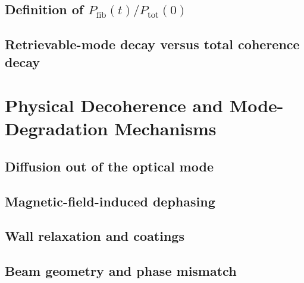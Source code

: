 \subsection{Definition of $P_{\text{fib}}(t)/P_{\text{tot}}(0)$}
\subsection{Retrievable-mode decay versus total coherence decay}

\section{Physical Decoherence and Mode-Degradation Mechanisms}
\subsection{Diffusion out of the optical mode}
\subsection{Magnetic-field-induced dephasing}
\subsection{Wall relaxation and coatings}
\subsection{Beam geometry and phase mismatch}

